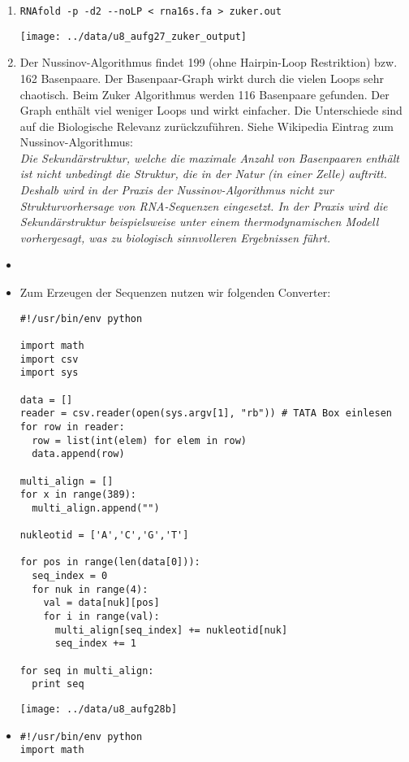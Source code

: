 \documentclass{homework}
\begin{document}
\begin{enumerate}
\begin{enumerate}
\item
\begin{verbatim}
RNAfold -p -d2 --noLP < rna16s.fa > zuker.out
\end{verbatim}

\texttt{[image: ../data/u8\_aufg27\_zuker\_output]}

\item
Der Nussinov-Algorithmus findet 199 (ohne Hairpin-Loop Restriktion) bzw. 162 Basenpaare. Der Basenpaar-Graph wirkt durch die vielen Loops sehr chaotisch. Beim Zuker Algorithmus werden 116 Basenpaare gefunden. 
Der Graph enthält viel weniger Loops und wirkt einfacher. 
Die Unterschiede sind auf die Biologische Relevanz zurückzuführen. Siehe Wikipedia Eintrag zum Nussinov-Algorithmus:\\
\textit{Die Sekundärstruktur, welche die maximale Anzahl von Basenpaaren enthält ist nicht unbedingt die Struktur, die in der Natur (in einer Zelle) auftritt. Deshalb wird in der Praxis der Nussinov-Algorithmus nicht zur Strukturvorhersage von RNA-Sequenzen eingesetzt. In der Praxis wird die Sekundärstruktur beispielsweise unter einem thermodynamischen Modell vorhergesagt, was zu biologisch sinnvolleren Ergebnissen führt.}

\end{enumerate}


\begin{itemize}
	\item
	\item
Zum Erzeugen der Sequenzen nutzen wir folgenden Converter:
\begin{verbatim}
#!/usr/bin/env python

import math
import csv
import sys

data = []
reader = csv.reader(open(sys.argv[1], "rb")) # TATA Box einlesen
for row in reader:
  row = list(int(elem) for elem in row)
  data.append(row)
  
multi_align = []
for x in range(389):
  multi_align.append("")

nukleotid = ['A','C','G','T']

for pos in range(len(data[0])):
  seq_index = 0
  for nuk in range(4): 
    val = data[nuk][pos]
    for i in range(val):
      multi_align[seq_index] += nukleotid[nuk]
      seq_index += 1
      
for seq in multi_align:
  print seq
\end{verbatim}

\texttt{[image: ../data/u8\_aufg28b]}
	\item
\begin{verbatim}
#!/usr/bin/env python
import math


\end{verbatim}
\end{itemize}
\end{enumerate}
\end{document}
